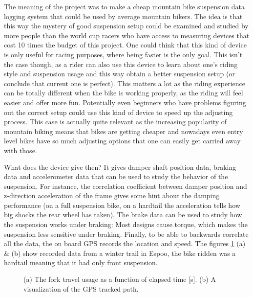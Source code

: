 \documentclass[a4paper,11pt]{article}
\begin{document}
The meaning of the project was to make a cheap mountain bike suspension data logging system that could be used by average mountain bikers. The idea is that this way the mystery of good suspension setup could be examined and studied by more people than the world cup racers who have access to measuring devices that cost 10 times the budget of this project. One could think that this kind of device is only useful for racing purposes, where being faster is the only goal. This isn't the case though, as a rider can also use this device to learn about one's riding style and suspension usage and this way obtain a better suspension setup (or conclude that current one is perfect). This matters a lot as the riding experience can be totally different when the bike is working properly, as the riding will feel easier and offer more fun. Potentially even beginners who have problems figuring out the correct setup could use this kind of device to speed up the adjusting process. This case is actually quite relevant as the increasing popularity of mountain biking means that bikes are getting cheaper and nowadays even entry level bikes have so much adjusting options that one can easily get carried away with those.

What does the device give then? It gives damper shaft position data, braking data and accelerometer data that can be used to study the behavior of the suspension. For instance, the correlation coefficient between damper position and z-direction acceleration of the frame gives some hint about the damping performance (on a full suspension bike, on a hardtail the acceleration tells how big shocks the rear wheel has taken). The brake data can be used to study how the suspension works under braking: Most designs cause torque, which makes the suspension less sensitive under braking. Finally, to be able to backwards correlate all the data, the on board GPS records the location and speed. The figures \ref{fig:data_plots} (a) \& (b) show recorded data from a winter trail in Espoo, the bike ridden was a hardtail meaning that it had only front suspension.

\begin{figure}[H]
    \hfill
    \hfill
    \hfill
    \caption{(a) The fork travel usage as a function of elapsed time [s]. (b) A visualization of the GPS tracked path.}
    \label{fig:data_plots}
\end{figure}
\end{document}
